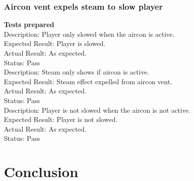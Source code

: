 \documentclass[11pt,a4paper]{article}
\begin{document}
\subsubsection{Aircon vent expels steam to slow player}
\textbf{Tests prepared}\\
Description: Player only slowed when the aircon is active.\\
Expected Result: Player is slowed.\\
Actual Result: As expected.\\
Status: Pass
\smallskip\\
Description: Steam only shows if aircon is active.\\
Expected Result: Steam effect expelled from aircon vent.\\
Actual Result: As expected.\\
Status: Pass
\smallskip\\
Description: Player is not slowed when the aircon is not active.\\
Expected Result: Player is not slowed.\\
Actual Result: As expected.\\
Status: Pass
\section{Conclusion}

\newpage
\end{document}
